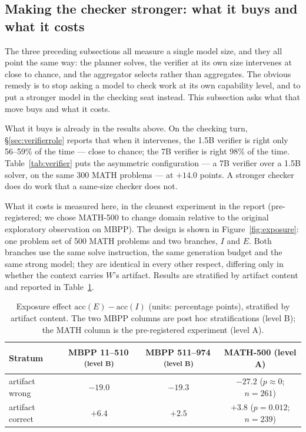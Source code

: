 \documentclass[11pt,a4paper]{article}
\newcommand{\mucB}{\textsuperscript{\,(level B)}}
\newcommand{\acc}{\mathrm{acc}}
\begin{document}
\subsection{Making the checker stronger: what it buys and what it costs}\label{sec:termL}

The three preceding subsections all measure a single model size, and they all point the same way: the planner solves, the verifier at its own size intervenes at close to chance, and the aggregator selects rather than aggregates. The obvious remedy is to stop asking a model to check work at its own capability level, and to put a stronger model in the checking seat instead. This subsection asks what that move buys and what it costs.

What it buys is already in the results above. On the checking turn, \S\ref{sec:verifierrole} reports that when it intervenes, the 1.5B verifier is right only 56--59\% of the time --- close to chance; the 7B verifier is right 98\% of the time. Table~\ref{tab:verifier} puts the asymmetric configuration --- a 7B verifier over a 1.5B solver, on the same 300 MATH problems --- at $+14.0$ points. A stronger checker does do work that a same-size checker does not.

What it costs is measured here, in the cleanest experiment in the report (pre-registered; we chose MATH-500 to change domain relative to the original exploratory observation on MBPP). The design is shown in Figure~\ref{fig:exposure}: one problem set of 500 MATH problems and two branches, $I$ and $E$. Both branches use the same solve instruction, the same generation budget and the same strong model; they are identical in every other respect, differing only in whether the context carries $W$'s artifact. Results are stratified by artifact content and reported in Table~\ref{tab:exposure}.

\begin{table}[htbp]
\centering
\small
\begin{tabular}{@{}l c c c@{}}
\toprule
Stratum & MBPP 11--510\mucB & MBPP 511--974\mucB & MATH-500 (level A)\\
\midrule
artifact wrong  & $-19.0$ & $-19.3$ & $-27.2$ ($p\approx 0$; $n=261$)\\
artifact correct & $+6.4$ & $+2.5$ & $+3.8$ ($p=0.012$; $n=239$)\\
\bottomrule
\end{tabular}
\caption{Exposure effect $\acc(E)-\acc(I)$ (units: percentage points), stratified by artifact content. The two MBPP columns are post hoc stratifications (level B); the MATH column is the pre-registered experiment (level A).}
\label{tab:exposure}
\end{table}
\end{document}
